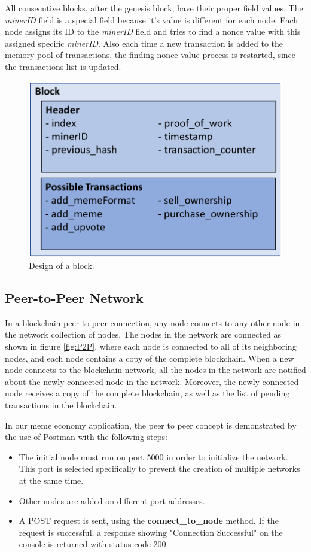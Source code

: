 \documentclass[12pt]{article}
\begin{document}
All consecutive blocks, after the genesis block, have their proper field values. The \textit{minerID} field is a special field because it's value is different for each node. Each node assigns its ID to the \textit{minerID} field and tries to find a nonce value with this assigned specific \textit{minerID}. Also each time a new transaction is added to the memory pool of transactions, the finding nonce value process is restarted, since the transactions list is updated.

\begin{figure}[H]
    \centering
    \includegraphics[width=12cm]{../report_MemeEcon/images/block_design.pdf}
    \caption{Design of a block.}
    \label{fig:block_design}
\end{figure}

\subsection{Peer-to-Peer Network} %
In a blockchain peer-to-peer connection, any node connects to any other node in the network collection of nodes. The nodes in the network are connected as shown in figure \ref{fig:P2P}, where each node is connected to all of its neighboring nodes, and each node contains a copy of the complete blockchain. When a new node connects to the blockchain network, all the nodes in the network are notified about the newly connected node in the network. Moreover, the newly connected node receives a copy of the complete blockchain, as well as the list of pending transactions in the blockchain. 

In our meme economy application, the peer to peer concept is demonstrated by the use of Postman with the following steps:
\begin{itemize}
    \item The initial node must run on port 5000 in order to initialize the network. This port is selected specifically to prevent the creation of multiple networks at the same time.
    \item Other nodes are added on different port addresses.
    \item A POST request is sent, using the \textbf{connect\_to\_node} method. If the request is successful, a response showing "Connection Successful" on the console is returned with status code 200.
\end{itemize}
\end{document}
